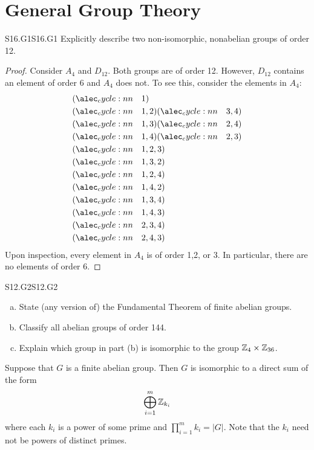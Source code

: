\documentclass[../AlgebraQualSolutions.tex]{subfiles}
\begin{document}
\section{General Group Theory}

\begin{prob}{S16.G1}{S16.G1}
	Explicitly describe two non-isomorphic, nonabelian groups of order 12.
\end{prob}

\begin{proof}
	Consider $A_4$ and $D_{12}$. Both groups are of order 12. However, $D_{12}$ contains an element of order 6 and $A_4$ does not. To see this, consider the elements in $A_4$:
		\begin{align*}
			&\perm{1}\\
			&\perm{1,2}\perm{3,4}\\
			&\perm{1,3}\perm{2,4}\\
			&\perm{1,4}\perm{2,3}\\
			&\perm{1,2,3}\\
			&\perm{1,3,2}\\
			&\perm{1,2,4}\\
			&\perm{1,4,2}\\
			&\perm{1,3,4}\\
			&\perm{1,4,3}\\
			&\perm{2,3,4}\\
			&\perm{2,4,3}
		\end{align*}
	Upon inspection, every element in $A_4$ is of order 1,2, or 3. In particular, there are no elements of order 6.
\end{proof}

\begin{prob}{S12.G2}{S12.G2}
	\begin{enumerate}[(a)]
		\item State (any version of) the Fundamental Theorem of finite abelian groups.
		\item Classify all abelian groups of order 144.
		\item Explain which group in part (b) is isomorphic to the group $\mathbb{Z}_4 \times \mathbb{Z}_{36}$.
	\end{enumerate}
\end{prob}

Suppose that $G$ is a finite abelian group. Then $G$ is isomorphic to a direct sum of the form
	\[\bigoplus_{i=1}^m \mathbb{Z}_{k_i}\]
where each $k_i$ is a power of some prime and $\prod_{i=1}^m k_i = |G|$. Note that the $k_i$ need not be powers of distinct primes.
\end{document}
